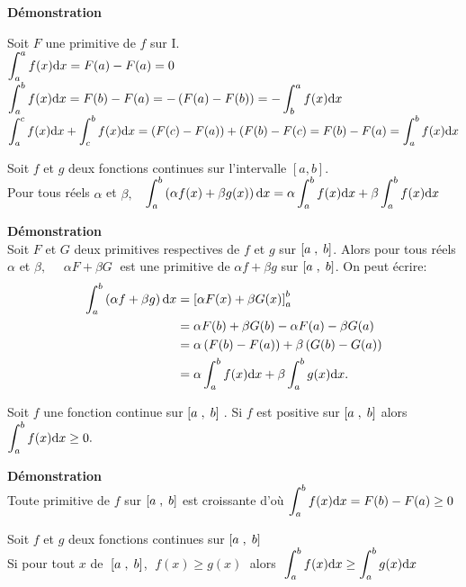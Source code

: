  
 \textbf{Démonstration}
 
 
 Soit $F$ une primitive de $f$ sur I.\\
 $ \displaystyle\int_{a}^{a}f(x){\rm d}x = F(a)-F(a)=0 $\\
 $ \displaystyle\int_{a}^{b}f(x){\rm d}x=F(b)-F(a) =-\left(F(a)-F(b)\right) =-\displaystyle\int_{b}^{a}f(x){\rm d}x$\\
 
 $ \displaystyle\int_{a}^{c}f(x){\rm d}x +\displaystyle\int_{c}^{b}f(x){\rm d}x=(F(c)-F(a) ) +(F(b)-F(c)=F(b)-F(a)=\displaystyle\int_{a}^{b}f(x){\rm d}x$\\
\begin{theorem}[linéarité]
Soit $f$ et $g$ deux fonctions continues sur l'intervalle $ [a, b] $.\\
Pour tous réels $\alpha$ et $\beta,\;\;$ $ \displaystyle\int_{a}^{b}\left(\alpha f(x)+\beta g(x)\right){\rm d}x =\alpha\displaystyle\int_{a}^{b}f(x){\rm d}x+\beta \displaystyle\int_{a}^{b}f(x){\rm d}x$
\end{theorem}

\textbf{Démonstration}\\
Soit  $F$ et $G$  deux primitives respectives de $f$ et $g$ sur $ \left[a\;,\; b\right] $. Alors  pour tous réels $\alpha$ et $\beta,\quad $ $ \alpha F+\beta G \;$   est une primitive de $ \alpha f+\beta g $ sur $ \left[a\;,\; b\right] $. On peut écrire:
\begin{align*}
\displaystyle\int_{a}^{b}\left(\alpha f+  \beta g\right){\rm d}x & =\left[  \alpha F(x)+ \beta G(x) \right]_a^b\\
& = \alpha F(b)+ \beta G (b)-\alpha F(a)- \beta G(a)\\
& = \alpha\left(F(b)- F(a)\right)+\beta\left( G(b)- G(a)\right)\\
& = \alpha \displaystyle\int_{a}^{b} f(x){\rm d}x+\beta \displaystyle\int_{a}^{b} g(x){\rm d}x.
\end{align*}

\begin{theorem}[positivité]
Soit $f$ une fonction continue sur $ \left[a\;,\; b\right] \; $. Si $f$ est positive sur  $ \left[a\;,\; b\right] $  alors $ \displaystyle\int_{a}^{b}f(x){\rm d}x\geq 0. $

\end{theorem}

\textbf{Démonstration}\\
Toute primitive de $f$ sur $ \left[a\;,\; b\right] $  est croissante d'où  $ \displaystyle\int_{a}^{b}f(x){\rm d}x = F(b)-F(a)\geq 0 $

\begin{corollary}[comparaison]
Soit $f$ et $g$ deux fonctions continues sur $ \left[a\;,\; b\right] $\\
Si   pour tout $ x $  de $\; \left[a\;,\; b\right]$, $ \; f(x) \geq g(x)\; $  alors $ \; \displaystyle\int_{a}^{b}f(x){\rm d}x\geq \displaystyle\int_{a}^{b}g(x){\rm d}x $
\end{corollary} 

